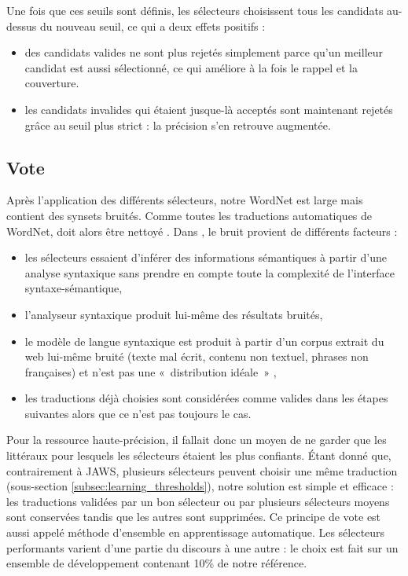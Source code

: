 Une fois que ces seuils sont définis, les sélecteurs choisissent tous les candidats au-dessus du nouveau seuil, ce qui a deux effets positifs :

\begin{itemize}
    \item des candidats valides ne sont plus rejetés simplement parce qu'un meilleur candidat est aussi sélectionné, ce qui améliore à la fois le rappel et la couverture.
    \item les candidats invalides qui étaient jusque-là acceptés sont maintenant rejetés grâce au seuil plus strict : la précision s'en retrouve augmentée.
\end{itemize}

\subsection{Vote}
\label{subsec:voting}

Après l'application des différents sélecteurs, notre WordNet est large mais contient des synsets bruités. Comme toutes les traductions automatiques de WordNet, \newjaws{} doit alors être nettoyé \citep{sagot2012cleaning}. Dans \newjaws{}, le bruit provient de différents facteurs :

\begin{itemize}
    \item les sélecteurs essaient d'inférer des informations sémantiques à partir d'une analyse syntaxique sans prendre en compte toute la complexité de l'interface syntaxe-sémantique,
    \item l'analyseur syntaxique produit lui-même des résultats bruités,
    \item le modèle de langue syntaxique est produit à partir d'un corpus extrait du web lui-même bruité (texte mal écrit, contenu non textuel, phrases non françaises) et n'est pas une «~distribution idéale~» \citep{copestakelexicalised},
    \item les traductions déjà choisies sont considérées comme valides dans les étapes suivantes alors que ce n'est pas toujours le cas.
\end{itemize}

Pour la ressource haute-précision, il fallait donc un moyen de ne garder que les littéraux pour lesquels les sélecteurs étaient les plus confiants. Étant donné que, contrairement à JAWS, plusieurs sélecteurs peuvent choisir une même traduction (sous-section \ref{subsec:learning_thresholds}), notre solution est simple et efficace : les traductions validées par un bon sélecteur ou par plusieurs sélecteurs moyens sont conservées tandis que les autres sont supprimées. Ce principe de vote est aussi appelé méthode d'ensemble en apprentissage automatique. Les sélecteurs performants varient d'une partie du discours à une autre : le choix est fait sur un ensemble de développement contenant 10\% de notre référence.


